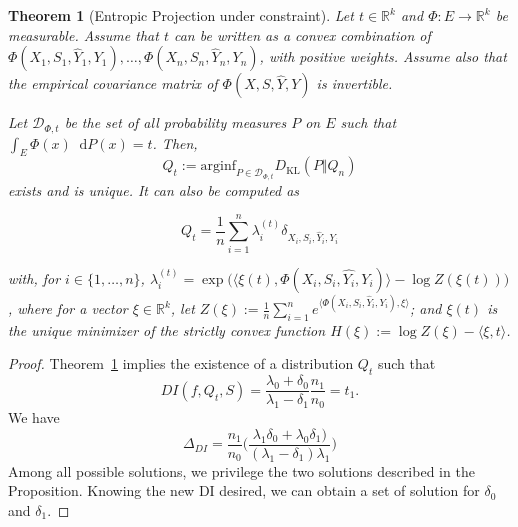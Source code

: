 \documentclass[10pt,a4paper]{amsart}
\newtheorem{theorem}{Theorem}
\newcommand{\KL}{D_{\mathrm{KL}}}
\newcommand{\dd}{\mathop{}\mathopen{}\mathrm{d}}
\begin{document}
\begin{theorem}[Entropic Projection under constraint] \label{thm:discrete:reweigth:multidim}
	Let $t \in \mathbb{R}^k$ and $\Phi : E \to \mathbb{R}^k$ be measurable.
	Assume that $t$ can be written as a convex combination of $\Phi(X_1,S_1, \widehat{Y}_1,Y_1) , \ldots , \Phi(X_n,S_n, \widehat{Y}_n,Y_n)$, with positive weights. Assume also that the empirical covariance matrix of $\Phi(X,S,\hat{Y}, Y)$ is invertible.

	Let $\mathcal{D}_{\Phi,t}$ be the set of all probability measures $P$ on $E$ such that $
	\int_{E} \Phi(x) \dd P(x)=t$.
		Then, \begin{equation} \label{thesol:Qn}
Q_t:=\mathrm{arginf}_{P\in\mathcal{D}_{\Phi,t}}\KL(P \Vert Q_n)
\end{equation}
    exists and is unique. It can also be computed as 

        \begin{equation}
            Q_t=
		\frac{1}{n}
		\sum_{i=1}^n
		\lambda_i^{(t)}
		\delta_{X_i , S_i, \widehat{Y}_i , Y_i}
        \end{equation}
        
        with, for $i\in\{1,\ldots,n\}$,
	$\lambda^{(t)}_i
		= \exp
		\bigg( \langle\xi(t) ,  \Phi(X_i,S_i, \widehat{Y_i},Y_i) \rangle - \log Z(\xi(t))
		\bigg)$, where for a  vector $\xi \in \mathbb{R}^k$, let $Z(\xi):=\frac{1}{n} \sum_{i=1}^n e^{\langle  \Phi(X_i,S_i, \widehat{Y}_i,Y_i) , \xi \rangle}$; and $\xi(t)$ is the unique minimizer of the strictly convex function
	$H(\xi):=\log Z(\xi)-\langle\xi,t\rangle$.
\end{theorem}

\begin{proof}
    
Theorem~\ref{thm:discrete:reweigth:multidim} implies the existence of a distribution $Q_t$ such that \[DI(f,Q_t,S)= \frac{\lambda_0 + \delta_0}{\lambda_1 - \delta_1}\frac{n_1}{n_0}=t_1. \]
 We have
\[\Delta_{DI} =
 \frac{n_1}{n_0}\bigg( \frac{\lambda_1 \delta_0 + \lambda_0 \delta_1)}{(\lambda_1 - \delta_1)\lambda_1}\bigg)
\] 
Among all possible solutions, we privilege the two solutions described in the Proposition. Knowing the new DI desired, we can obtain a set of solution for $\delta_0$ and $\delta_1$.
 \end{proof}
\end{document}
